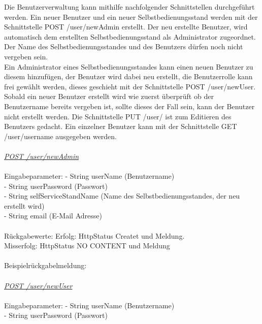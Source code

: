 Die Benutzerverwaltung kann mithilfe nachfolgender Schnittstellen durchgeführt werden. Ein neuer Benutzer und ein neuer Selbstbedienungsstand werden mit der Schnittstelle POST /user/newAdmin erstellt. Der neu erstellte Benutzer, wird automatisch dem erstellten Selbstbedienungsstand als Administrator zugeordnet. Der Name des Selbstbedienungsstandes und des Benutzers dürfen noch nicht vergeben sein.
\\
Ein Administrator eines  Selbstbedienungsstandes kann einen neuen Benutzer zu diesem hinzufügen, der Benutzer wird dabei neu erstellt, die Benutzerrolle kann frei gewählt werden, dieses geschieht mit der Schnittstelle POST /user/newUser. 
\\
Sobald ein neuer Benutzer erstellt wird wie zuerst überprüft ob der Benutzername bereits vergeben ist, sollte dieses der Fall sein, kann der Benutzer nicht erstellt werden. Die Schnittstelle PUT /user/ ist zum Editieren des Benutzers gedacht. Ein einzelner Benutzer kann mit der Schnittstelle GET /user/{username} ausgegeben werden.
\\
\\
\textit{\underline{POST /user/newAdmin}}
\\
\\
Eingabeparameter: \tab			- String userName (Benutzername)\\
\tab \tab                        		- String userPassword (Passwort)\\
\tab \tab                         		- String selfServiceStandName (Name des Selbstbedienungsstandes, der neu erstellt wird) \\
\tab \tab                         		- String email (E-Mail Adresse)\\                  
\\
Rückgabewerte: \tab 					Erfolg: HttpStatus Createt und Meldung.\\
\tab \tab 								Misserfolg: HttpStatus NO CONTENT und Meldung\\
\\
Beispielrückgabelmeldung:	
\\
\\
\textit{\underline{POST /user/newUser}}
\\
\\
Eingabeparameter: \tab			- String userName (Benutzername)\\
\tab \tab                        		- String userPassword (Passwort)\\
